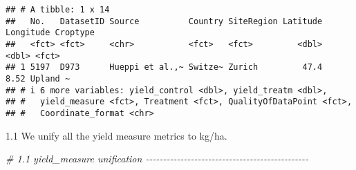 \documentclass[
]{article}
\newenvironment{Shaded}{\begin{snugshade}}{\end{snugshade}}
\newcommand{\CommentTok}[1]{\textcolor[rgb]{0.56,0.35,0.01}{\textit{#1}}}
\begin{document}
\begin{verbatim}
## # A tibble: 1 x 14
##   No.   DatasetID Source          Country SiteRegion Latitude Longitude Croptype
##   <fct> <fct>     <chr>           <fct>   <fct>         <dbl>     <dbl> <fct>   
## 1 5197  D973      Hueppi et al.,~ Switze~ Zurich         47.4      8.52 Upland ~
## # i 6 more variables: yield_control <dbl>, yield_treatm <dbl>,
## #   yield_measure <fct>, Treatment <fct>, QualityOfDataPoint <fct>,
## #   Coordinate_format <chr>
\end{verbatim}

1.1 We unify all the yield measure metrics to kg/ha.

\begin{Shaded}
\begin{Highlighting}[]
\CommentTok{\# 1.1 yield\_measure unification {-}{-}{-}{-}{-}{-}{-}{-}{-}{-}{-}{-}{-}{-}{-}{-}{-}{-}{-}{-}{-}{-}{-}{-}{-}{-}{-}{-}{-}{-}{-}{-}{-}{-}{-}{-}{-}{-}{-}{-}{-}{-}{-}{-}{-}{-}{-}}


\end{Highlighting}
\end{Shaded}
\end{document}
